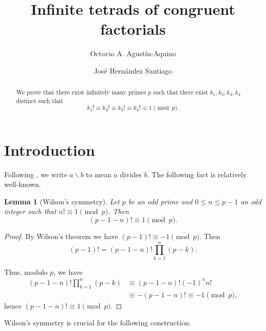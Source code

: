 \documentclass[12pt]{amsart}
\newtheorem{lem}[thm]{Lemma}
\theoremstyle{remark}
\begin{document}
\title{Infinite tetrads of congruent factorials}


\author{Octavio A.  Agustín-Aquino}
\address{Instituto de Física y Matemáticas, Universidad Tecnológica de la Mixteca, Huajuapan de León, Oaxaca, México}

\author{José Hernández Santiago}
\address{Escuela Superior de Matemáticas No. 2, Universidad Autónoma de Guerrero, Ciudad Altamirano, Guerrero, México}

\begin{abstract}
We prove that there exist infinitely many primes $p$ such that there exist $k_{1},k_{2},k_{3},k_{4}$ distinct
such that
\[
k_{1}! \equiv k_{2}! \equiv k_{3}! \equiv k_{4}! \equiv 1 \pmod{p}.
\]
\end{abstract}


 \maketitle


\section{Introduction}

Following \cite{GKP94}, we write $a\backslash b$ to mean $a$ divides $b$. The following fact is relatively well-known.

\begin{lem}[Wilson's symmetry]
Let $p$ be an odd prime and $0\leq n \leq p-1$ an odd integer such that $n!\equiv 1\pmod{p}$. Then
\[
(p-1-n)!\equiv 1 \pmod{p}.
\]
\end{lem}
\begin{proof}
By Wilson's theorem we have $(p-1)!\equiv -1 \pmod{p}$. Then
\[
 (p-1)! = (p-1-n)! \prod_{k=1}^{n}(p-k).
\]

Thus, modulo $p$, we have
\begin{align*}
 (p-1-n)! \prod_{k=1}^{n}(p-k) &\equiv (p-1-n)!(-1)^{n}n!\\
 &\equiv -(p-1-n)! \equiv -1 \pmod{p},
\end{align*}
hence $(p-1-n)!\equiv 1 \pmod{p}$. 
\end{proof}

Wilson's symmetry is crucial for the following construction.
\end{document}
